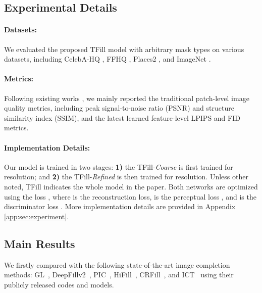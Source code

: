 \documentclass[10pt,twocolumn,letterpaper]{article}
\begin{document}
\subsection{Experimental Details}

\paragraph{Datasets:} We evaluated the proposed TFill model with arbitrary mask types on various datasets, including CelebA-HQ \cite{liu2015faceattributes,karras2018progressive}, FFHQ \cite{karras2019style}, Places2 \cite{zhou2018places}, and ImageNet \cite{russakovsky2015imagenet}.

\vspace{-0.2cm}\paragraph{Metrics:} Following existing works \cite{Nazeri_2019_ICCV,Wan_2021_ICCV,zheng2021pluralistic}, we mainly reported the traditional patch-level image quality metrics, including peak signal-to-noise ratio (PSNR) and structure similarity index (SSIM), and the latest learned feature-level LPIPS \cite{zhang2018perceptual} and FID \cite{heusel2017gans} metrics. 

\vspace{-0.2cm}\paragraph{Implementation Details:} Our model is trained in two stages: \textbf{1)} the TFill-\emph{Coarse} is first trained for  resolution; and \textbf{2)} the TFill-\emph{Refined} is then trained for  resolution. Unless other noted, TFill indicates the whole model in the paper. Both networks are optimized using the loss , where  is the  reconstruction loss,  is the perceptual loss \cite{johnson2016perceptual}, and  is the discriminator loss \cite{goodfellow2014generative}. More implementation details are provided in Appendix \ref{app:sec:experiment}. 

\subsection{Main Results}

We firstly compared with the following state-of-the-art image completion methods: GL~\cite{iizuka2017globally}, DeepFillv2~\cite{yu2019free}, PIC~\cite{Zheng_2019_CVPR}, HiFill~\cite{yi2020contextual}, CRFill~\cite{zeng2021generative}, and ICT~\cite{Wan_2021_ICCV} using their publicly released codes and models. 
\end{document}
